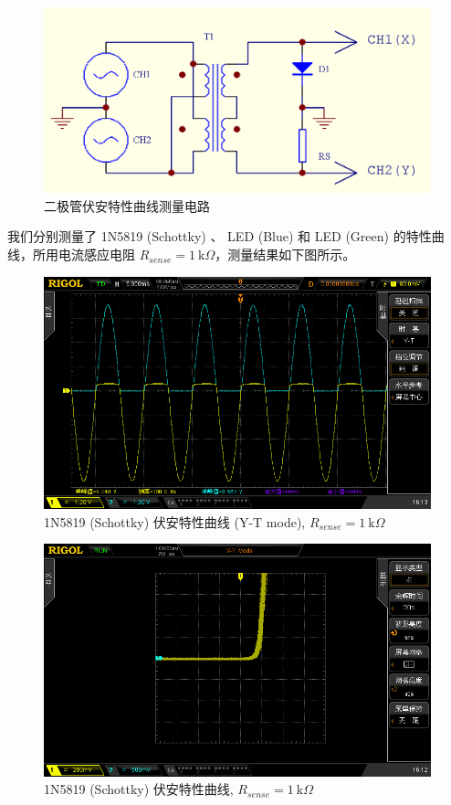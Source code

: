\documentclass[UTF8]{article}
\begin{document}
\begin{figure}[H]\centering
    \includegraphics[width=0.5\columnwidth]{LCE-01-二极管/assets/实验原理/二极管伏安特性曲线.png}
    \caption{二极管伏安特性曲线测量电路}
\end{figure}

我们分别测量了 1N5819 (Schottky) 、 LED (Blue) 和 LED (Green) 的特性曲线，所用电流感应电阻 $R_{sense} = 1 \ \mathrm{k}\Omega$，测量结果如下图所示。

\begin{figure}[H]\centering
    \includegraphics[width=\columnwidth]{LCE-01-二极管/assets/二极管伏安特性曲线/1N5819 Schottky Y-T.png}
    \caption{1N5819 (Schottky) 伏安特性曲线 (Y-T mode), $R_{sense} = 1 \ \mathrm{k}\Omega$}
\end{figure}

\begin{figure}[H]\centering
    \includegraphics[width=\columnwidth]{LCE-01-二极管/assets/二极管伏安特性曲线/1N5819 Schottky.png}
    \caption{1N5819 (Schottky) 伏安特性曲线, $R_{sense} = 1 \ \mathrm{k}\Omega$}
\end{figure}
\end{document}
